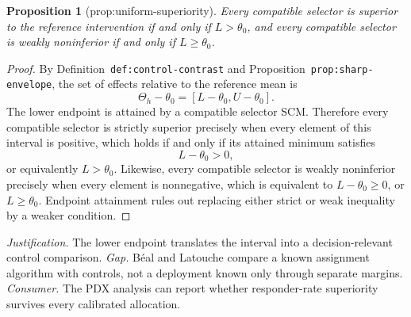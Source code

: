 \documentclass{article}
\newtheorem{proposition}{Proposition}
\begin{document}
\begin{proposition}[prop:uniform-superiority]\label{prop:uniform-superiority}
Every compatible selector is superior to the reference intervention if and only if \(L>\theta_0\), and every compatible selector is weakly noninferior if and only if \(L\ge\theta_0\).
\end{proposition}
\begin{proof}
By Definition~\texttt{def:control-contrast} and Proposition~\texttt{prop:sharp-envelope}, the set of effects relative to the reference mean is
\[
\Theta_h-\theta_0=[L-\theta_0,U-\theta_0].
\]
The lower endpoint is attained by a compatible selector SCM.  Therefore every compatible selector is strictly superior precisely when every element of this interval is positive, which holds if and only if its attained minimum satisfies
\[
L-\theta_0>0,
\]
or equivalently \(L>\theta_0\).  Likewise, every compatible selector is weakly noninferior precisely when every element is nonnegative, which is equivalent to \(L-\theta_0\geq0\), or \(L\geq\theta_0\).  Endpoint attainment rules out replacing either strict or weak inequality by a weaker condition.
\end{proof}
\par\smallskip\noindent \textit{Justification.} The lower endpoint translates the interval into a decision-relevant control comparison. \textit{Gap.} Béal and Latouche compare a known assignment algorithm with controls, not a deployment known only through separate margins. \textit{Consumer.} The PDX analysis can report whether responder-rate superiority survives every calibrated allocation.
\end{document}
